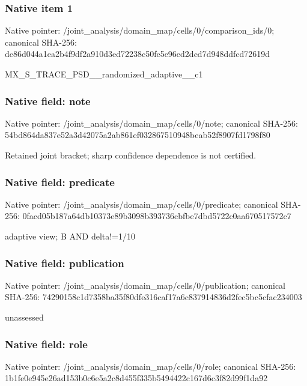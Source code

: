 \documentclass[10pt,a4paper]{article}
\begin{document}
\subsubsection{Native item 1}
Native pointer: /joint\_\allowbreak{}analysis/domain\_\allowbreak{}map/cells/0/comparison\_\allowbreak{}ids/0; canonical SHA-256: dc86d044a1ea2b4f9df2a910d3ed72238c50fe5e96ed2dcd7d948ddfcd72619d

\begingroup\raggedright\sloppy MX\_\allowbreak{}S\_\allowbreak{}TRACE\_\allowbreak{}PSD\_\allowbreak{}\_\allowbreak{}randomized\_\allowbreak{}adaptive\_\allowbreak{}\_\allowbreak{}c1\par\endgroup

\subsubsection{Native field: note}
Native pointer: /joint\_\allowbreak{}analysis/domain\_\allowbreak{}map/cells/0/note; canonical SHA-256: 54bd864da837e52a3d42075a2ab861ef032867510948beab52f8907fd1798f80

\begingroup\raggedright\sloppy Retained joint bracket;\allowbreak{} sharp confidence dependence is not certified.\par\endgroup

\subsubsection{Native field: predicate}
Native pointer: /joint\_\allowbreak{}analysis/domain\_\allowbreak{}map/cells/0/predicate; canonical SHA-256: 0facd05b187a64db10373e89b3098b393736cbfbe7dbd5722c0aa670517572c7

\begingroup\raggedright\sloppy adaptive view;\allowbreak{} B AND delta!=\allowbreak{}1/\allowbreak{}10\par\endgroup

\subsubsection{Native field: publication}
Native pointer: /joint\_\allowbreak{}analysis/domain\_\allowbreak{}map/cells/0/publication; canonical SHA-256: 74290158c1d7358ba35f80dfe316caf17a6c837914836d2fec5bc5cfac234003

\begingroup\raggedright\sloppy unassessed\par\endgroup

\subsubsection{Native field: role}
Native pointer: /joint\_\allowbreak{}analysis/domain\_\allowbreak{}map/cells/0/role; canonical SHA-256: 1b1fe0e945e26ad153b0c6e5a2c8d455f335b5494422c167d6c3f82d99f1da92
\end{document}
